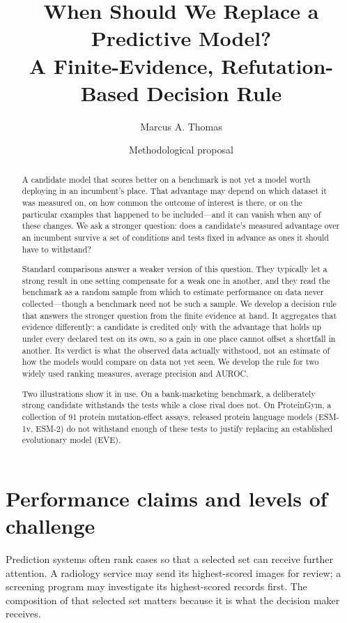 \documentclass[11pt]{article}
\title{When Should We Replace a Predictive Model?\\
\large A Finite-Evidence, Refutation-Based Decision Rule}
\author{Marcus A. Thomas}
\date{Methodological proposal}
\theoremstyle{remark}
\begin{document}
\maketitle

\begin{abstract}
A candidate model that scores better on a benchmark is not yet a model worth
deploying in an incumbent's place. That advantage may depend on which dataset it
was measured on, on how common the outcome of interest is there, or on the
particular examples that happened to be included---and it can vanish when any of
these changes. We ask a stronger question: does a candidate's measured advantage
over an incumbent survive a set of conditions and tests fixed in advance as ones
it should have to withstand?

Standard comparisons answer a weaker version of this question. They typically
let a strong result in one setting compensate for a weak one in another, and
they read the benchmark as a random sample from which to estimate performance on
data never collected---though a benchmark need not be such a sample. We develop a
decision rule that answers the stronger question from the finite evidence at
hand. It aggregates that evidence differently: a candidate is credited only with
the advantage that holds up under every declared test on its own, so a gain in
one place cannot offset a shortfall in another. Its verdict is what the observed
data actually withstood, not an estimate of how the models would compare on data
not yet seen. We develop the rule for two widely used ranking measures, average
precision and AUROC.

Two illustrations show it in use. On a bank-marketing benchmark, a deliberately
strong candidate withstands the tests while a close rival does not. On
ProteinGym, a collection of 91 protein mutation-effect assays, released protein
language models (ESM-1v, ESM-2) do not withstand enough of these tests to
justify replacing an established evolutionary model (EVE).
\end{abstract}


\section{Performance claims and levels of challenge}
\label{sec:introduction}

Prediction systems often rank cases so that a selected set can receive further
attention. A radiology service may send its highest-scored images for review;
a screening program may investigate its highest-scored records first. The
composition of that selected set matters because it is what the decision maker
receives.
\end{document}
